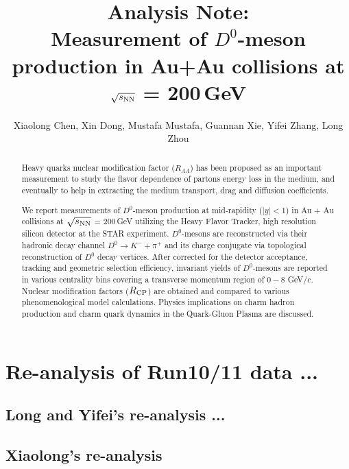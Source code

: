 \documentclass[a4paper]{article}
\title{Analysis Note: \\
Measurement of $D^0$-meson production in Au+Au collisions at $\sqrt{s_{\rm NN}}$ = 200\,GeV}
\author{Xiaolong Chen, Xin Dong, Mustafa Mustafa, Guannan Xie, Yifei Zhang, Long Zhou}
\begin{document}
\maketitle

\begin{abstract}

Heavy quarks nuclear modification factor ($R_{AA}$) has been proposed as an important measurement to study the flavor dependence of partons energy loss in the medium, and eventually to help in extracting the medium transport, drag and diffusion coefficients.


We report measurements of $D^0$-meson production at mid-rapidity ($|y|<$1) in Au + Au collisions at $\sqrt{s_{\rm NN}}$ = 200\,GeV utilizing the Heavy Flavor Tracker, high resolution silicon detector at the STAR experiment. $D^0$-mesons are reconstructed via their hadronic decay channel $D^0\rightarrow K^-+\pi^+$ and its charge conjugate via topological reconstruction of $D^0$ decay vertices. After corrected for the detector acceptance, tracking and geometric selection efficiency, invariant yields of $D^0$-mesons are reported in various centrality bins covering a transverse momentum region of $0-8$ GeV/$c$. Nuclear modification factors ($R_{\rm CP}$) are obtained and compared to various phenomenological model calculations. Physics implications on charm hadron production and charm quark dynamics in the Quark-Gluon Plasma are discussed.

\end{abstract}

\clearpage

\tableofcontents









\section{\label{Run1011}Re-analysis of Run10/11 data ... }

\subsection{Long and Yifei's re-analysis ... }



\subsection{Xiaolong's re-analysis}




\clearpage


% 
\end{document}
